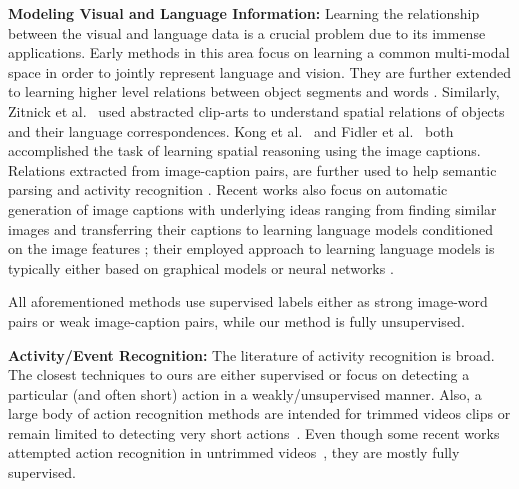 \noindent\textbf{Modeling Visual and Language Information:}
Learning the relationship between the visual and language data is a crucial problem due to its immense applications. Early methods \cite{matching} in this area focus on learning a common multi-modal space in order to jointly represent language and vision. They are further extended to learning higher level relations between object segments and words \cite{connecting}. Similarly, 
Zitnick et al.~\cite{zitnick2013learning,zitnick2013bringing} used abstracted clip-arts to understand spatial relations of objects and their language correspondences. Kong et al.~\cite{kong2014you} and 
Fidler et al.~\cite{fidler2013sentence} both accomplished the task of learning spatial reasoning using the image captions. Relations extracted from image-caption pairs, are further used to help semantic parsing \cite{yu2013grounded} and activity recognition \cite{motwani2012improving}. Recent works also focus on automatic generation of image captions with underlying ideas ranging from finding similar images and transferring their captions \cite{ordonez2011im2text} to learning language models conditioned on the image features \cite{kiros2014multimodal,socher2014grounded,farhadi2010every}; their employed approach to learning language models is typically either based on graphical models \cite{farhadi2010every} or neural networks \cite{socher2014grounded,kiros2014multimodal,deepAlignment}.

All aforementioned methods use supervised labels either as strong image-word pairs or weak image-caption pairs, while our method is fully unsupervised.

\noindent\textbf{Activity/Event Recognition:}
The literature of activity recognition is broad. The closest techniques to ours are either supervised or focus on detecting a particular (and often short) action in a weakly/unsupervised manner. Also, a large body of action recognition methods are intended for trimmed videos clips or remain limited to detecting very short actions~\cite{kuehne2011hmdb, UCF101, niebles10_eccv, laptev08_cvpr, efros03_iccv, ryoo09_iccv}. Even though some recent works attempted action recognition in untrimmed videos~\cite{THUMOS14, oneata2014lear, jainuniversity}, they are mostly fully supervised.

